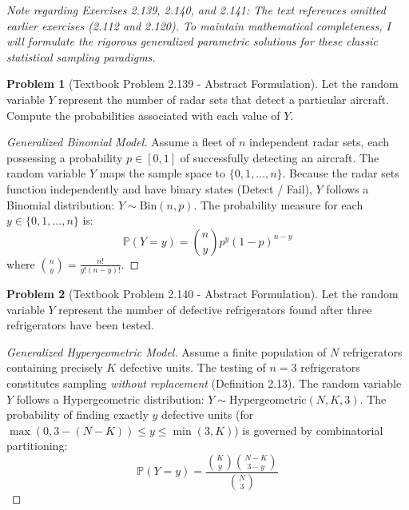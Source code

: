 \documentclass[11pt, letterpaper]{article}
\theoremstyle{definition}
\newtheorem{problem}{Problem}
\renewcommand{\P}{\mathbb{P}}
\begin{document}
\vspace{0.5cm}

\textit{Note regarding Exercises 2.139, 2.140, and 2.141: The text references omitted earlier exercises (2.112 and 2.120). To maintain mathematical completeness, I will formulate the rigorous generalized parametric solutions for these classic statistical sampling paradigms.}

\begin{problem}[Textbook Problem 2.139 - Abstract Formulation]
Let the random variable $Y$ represent the number of radar sets that detect a particular aircraft. Compute the probabilities associated with each value of $Y$.
\end{problem}
\begin{proof}[Generalized Binomial Model]
Assume a fleet of $n$ independent radar sets, each possessing a probability $p \in [0,1]$ of successfully detecting an aircraft. The random variable $Y$ maps the sample space to $\{0, 1, \dots, n\}$.
Because the radar sets function independently and have binary states (Detect / Fail), $Y$ follows a Binomial distribution: $Y \sim \text{Bin}(n, p)$.
The probability measure for each $y \in \{0, 1, \dots, n\}$ is:
\[ \P(Y=y) = \binom{n}{y} p^y (1-p)^{n-y} \]
where $\binom{n}{y} = \frac{n!}{y!(n-y)!}$.
\end{proof}

\vspace{0.5cm}

\begin{problem}[Textbook Problem 2.140 - Abstract Formulation]
Let the random variable $Y$ represent the number of defective refrigerators found after three refrigerators have been tested.
\end{problem}
\begin{proof}[Generalized Hypergeometric Model]
Assume a finite population of $N$ refrigerators containing precisely $K$ defective units. The testing of $n=3$ refrigerators constitutes sampling \textit{without replacement} (Definition 2.13). The random variable $Y$ follows a Hypergeometric distribution: $Y \sim \text{Hypergeometric}(N, K, 3)$.
The probability of finding exactly $y$ defective units (for $\max(0, 3 - (N-K)) \leq y \leq \min(3, K)$) is governed by combinatorial partitioning:
\[ \P(Y = y) = \frac{\binom{K}{y}\binom{N-K}{3-y}}{\binom{N}{3}} \]
\end{proof}

\vspace{0.5cm}
\end{document}
